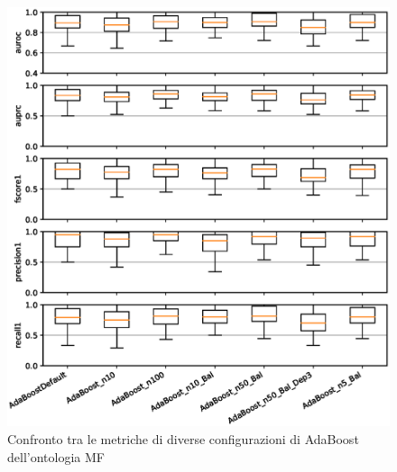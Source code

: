 \documentclass[12pt,a4paper,oneside,hidelinks]{report}
\begin{document}
\begin{figure}[hb]%
    \centering
    \includegraphics[scale = 0.80]{MF-AdaBoost-level1.eps}%
    \caption{Confronto tra le metriche di diverse configurazioni di AdaBoost dell'ontologia MF}%
    \label{figure:liv1.3}%
\end{figure}

\vspace*{\fill}

\vspace*{\fill}
\end{document}

